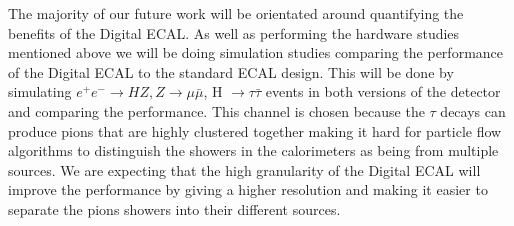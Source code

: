 The majority of our future work will be orientated around quantifying the benefits of the Digital \ac{ECAL}. As well as performing the hardware studies mentioned above we will be doing simulation studies comparing the performance of the Digital \ac{ECAL} to the standard \ac{ECAL} design. This will be done by simulating ${e^+e^-\rightarrow HZ, Z\rightarrow\mu\bar{\mu}}$, H ${\rightarrow \tau\bar{\tau}}$ events in both versions of the detector and comparing the performance. This channel is chosen because the $\tau$ decays can produce pions that are highly clustered together making it hard for particle flow algorithms to distinguish the showers in the calorimeters as being from multiple sources. We are expecting that the high granularity of the Digital \ac{ECAL} will improve the performance by giving a higher resolution and making it easier to separate the pions showers into their different sources.

